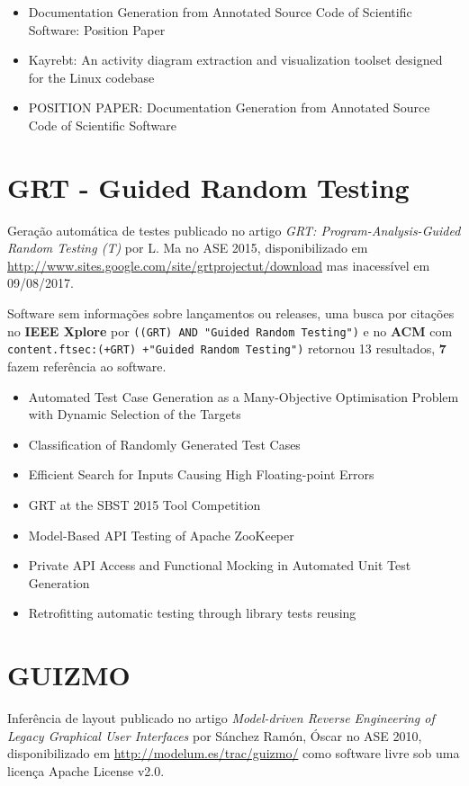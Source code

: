 \begin{itemize}
\item Documentation Generation from Annotated Source Code of Scientific Software: Position Paper
\item Kayrebt: An activity diagram extraction and visualization toolset designed for the Linux codebase
\item POSITION PAPER: Documentation Generation from Annotated Source Code of Scientific Software
\end{itemize}

\section{GRT - Guided Random Testing}

Geração automática de testes
publicado no artigo {\it GRT: Program-Analysis-Guided Random Testing (T)}
por L. Ma
no ASE 2015,
disponibilizado em \url{http://www.sites.google.com/site/grtprojectut/download}
mas inacessível em 09/08/2017.

Software sem informações sobre lançamentos ou releases,
uma busca por citações no {\bf IEEE Xplore} por
\texttt{((GRT) AND "Guided Random Testing")}
e no {\bf ACM} com
\texttt{content.ftsec:(+GRT) +"Guided Random Testing")}
retornou
13 resultados,
{\bf 7} fazem referência ao software.

\begin{itemize}
\item Automated Test Case Generation as a Many-Objective Optimisation Problem with Dynamic Selection of the Targets
\item Classification of Randomly Generated Test Cases
\item Efficient Search for Inputs Causing High Floating-point Errors
\item GRT at the SBST 2015 Tool Competition
\item Model-Based API Testing of Apache ZooKeeper
\item Private API Access and Functional Mocking in Automated Unit Test Generation
\item Retrofitting automatic testing through library tests reusing
\end{itemize}

\section{GUIZMO}

Inferência de layout
publicado no artigo {\it Model-driven Reverse Engineering of Legacy Graphical User Interfaces}
por S\'{a}nchez Ram\'{o}n, \'{O}scar
no ASE 2010,
disponibilizado em \url{http://modelum.es/trac/guizmo/}
como software livre
sob uma licença Apache License v2.0.

